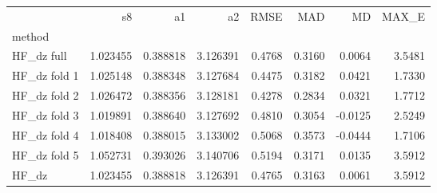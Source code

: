 \begin{tabular}{lrrrrrrr}
 & s8 & a1 & a2 & RMSE & MAD & MD & MAX_E \\
method &  &  &  &  &  &  &  \\
HF_dz full & 1.023455 & 0.388818 & 3.126391 & 0.4768 & 0.3160 & 0.0064 & 3.5481 \\
HF_dz fold 1 & 1.025148 & 0.388348 & 3.127684 & 0.4475 & 0.3182 & 0.0421 & 1.7330 \\
HF_dz fold 2 & 1.026472 & 0.388356 & 3.128181 & 0.4278 & 0.2834 & 0.0321 & 1.7712 \\
HF_dz fold 3 & 1.019891 & 0.388640 & 3.127692 & 0.4810 & 0.3054 & -0.0125 & 2.5249 \\
HF_dz fold 4 & 1.018408 & 0.388015 & 3.133002 & 0.5068 & 0.3573 & -0.0444 & 1.7106 \\
HF_dz fold 5 & 1.052731 & 0.393026 & 3.140706 & 0.5194 & 0.3171 & 0.0135 & 3.5912 \\
HF_dz & 1.023455 & 0.388818 & 3.126391 & 0.4765 & 0.3163 & 0.0061 & 3.5912 \\
\end{tabular}
